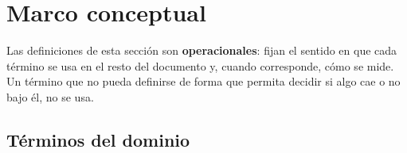 \section{Marco conceptual}
\label{sec:marco-conceptual}

Las definiciones de esta sección son \textbf{operacionales}: fijan el sentido en que
cada término se usa en el resto del documento y, cuando corresponde, cómo se mide.
Un término que no pueda definirse de forma que permita decidir si algo cae o no bajo
él, no se usa.

\subsection{Términos del dominio}
\label{sec:conc-dominio}

